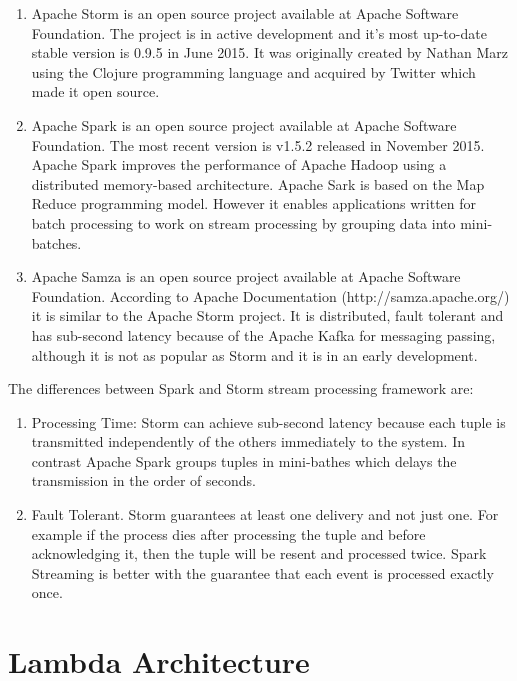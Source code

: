 \documentclass{lmproj}
\begin{document}
\begin{enumerate}
	\item Apache Storm is an open source project available at Apache Software Foundation. The project is in active development and it’s most up-to-date stable version is 0.9.5 in June 2015. It was originally created by Nathan Marz using the Clojure programming language and acquired by Twitter which made it open source. 
	\item Apache Spark is an open source project available at Apache Software Foundation. The most recent version is v1.5.2 released in November 2015. Apache Spark improves the performance of Apache Hadoop using a distributed memory-based architecture. Apache Sark is based on the Map Reduce programming model. However it enables applications written for batch processing to work on stream processing by grouping data into mini-batches.
	\item Apache Samza is an open source project available at Apache Software Foundation. According to Apache Documentation (http://samza.apache.org/) it is similar to the Apache Storm project. It is distributed, fault tolerant and has sub-second latency because of the Apache Kafka for messaging passing, although it is not as popular as Storm and it is in an early development.
\end{enumerate}

The differences between Spark and Storm stream processing framework are:

\begin{enumerate}
	\item Processing Time: Storm can achieve sub-second latency because each tuple is transmitted independently of the others immediately to the system. In contrast Apache Spark groups tuples in mini-bathes which delays the transmission in the order of seconds.
	\item Fault Tolerant. Storm guarantees at least one delivery and not just one. For example if the process dies after processing the tuple and before acknowledging it, then the tuple will be resent and processed twice. Spark Streaming is better with the guarantee that each event is processed exactly once.  
\end{enumerate}

\section{Lambda Architecture}
\label{relatedwork}


\end{document}
